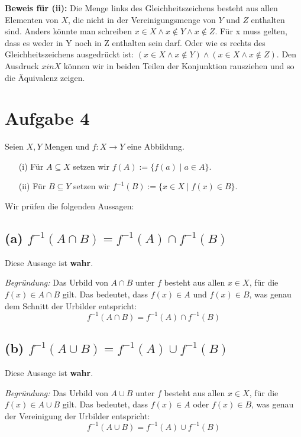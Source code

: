 \documentclass[11pt]{article}
\begin{document}
\bigskip
\textbf{Beweis für (ii):}
Die Menge links des Gleichheitszeichens besteht aus allen Elementen von \( X \), die nicht in der Vereinigungsmenge von \( Y \) und \( Z \) enthalten sind.
    Anders könnte man schreiben \( x \in X \land x \notin Y \land x \notin Z\). Für x muss gelten, dass es weder in Y noch in Z enthalten sein darf.
    Oder wie es rechts des Gleichheitszeichens ausgedrückt ist: \( (x \in X \land x \notin Y) \land (x \in X \land x \notin Z)\).
    Den Ausdruck \( x in X \) können wir in beiden Teilen der Konjunktion rausziehen und so die Äquivalenz zeigen.


\section*{Aufgabe 4}

Seien \( X, Y \) Mengen und \( f : X \to Y \) eine Abbildung.

\begin{enumerate}
    \item[(i)] Für \( A \subseteq X \) setzen wir \( f(A) := \{f(a) \mid a \in A\} \).
    \item[(ii)] Für \( B \subseteq Y \) setzen wir \( f^{-1}(B) := \{x \in X \mid f(x) \in B\} \).
\end{enumerate}

Wir prüfen die folgenden Aussagen:

\subsection*{(a) \( f^{-1}(A \cap B) = f^{-1}(A) \cap f^{-1}(B) \)}

Diese Aussage ist \textbf{wahr}.

\textit{Begründung:} Das Urbild von \( A \cap B \) unter \( f \) besteht aus allen \( x \in X \), für die \( f(x) \in A \cap B \) gilt. Das bedeutet, dass \( f(x) \in A \) und \( f(x) \in B \), was genau dem Schnitt der Urbilder entspricht:
\[
f^{-1}(A \cap B) = f^{-1}(A) \cap f^{-1}(B)
\]

\subsection*{(b) \( f^{-1}(A \cup B) = f^{-1}(A) \cup f^{-1}(B) \)}

Diese Aussage ist \textbf{wahr}.

\textit{Begründung:} Das Urbild von \( A \cup B \) unter \( f \) besteht aus allen \( x \in X \), für die \( f(x) \in A \cup B \) gilt. Das bedeutet, dass \( f(x) \in A \) oder \( f(x) \in B \), was genau der Vereinigung der Urbilder entspricht:
\[
f^{-1}(A \cup B) = f^{-1}(A) \cup f^{-1}(B)
\]
\end{document}
